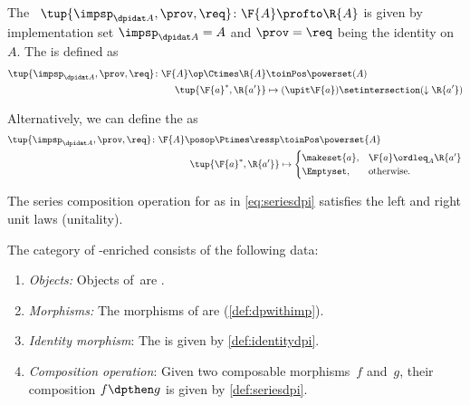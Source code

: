 \begin{definition}
    \label{def:identitydpi}
    The ~$\tup{\impsp_{\dpidat A},\prov,\req} \colon \F{A} \profto \R{A}$ is given by implementation set $\impsp_{\dpidat A} = A$ and $\prov=\req$ being the identity on $A$.
    The  is defined as
    \begin{align}
        \tup{\impsp_{\dpidat A},\prov,\req} \colon \F{A}\op \Ctimes \R{A} & \toinPos \powerset(A) \\
        \tup{\F{a}^*,\R{a'}}                                              & \mapsto (\upit \F{a}) \setintersection (\downarrow \R{a'})
    \end{align}
\end{definition}
\begin{remark}
    Alternatively, we can define the  as
    \begin{align}
        \tup{\impsp_{\dpidat A},\prov,\req}\colon \F{A}\posop \Ptimes \ressp & \toinPos \powerset{A} \\
        \tup{\F{a}^*,\R{a'}}                                                 & \mapsto
        \begin{cases}
            \makeset{a}, & \F{a}\ordleq_A \R{a'} \\
            \Emptyset,   & \text{otherwise}.
        \end{cases}
    \end{align}
\end{remark}

\begin{lemma}
    \label{lem:dp-unital}
    The series composition operation for  as in \cref{eq:seriesdpi} satisfies the left and right unit laws (unitality).
\end{lemma}


\begin{definition}
    \label{def:set-enriched-dp}
    The category of \Set-enriched  \DPI consists of the following data:
    \begin{enumerate}
        \item \emph{Objects:}
              Objects of~\DPI are .
        \item \emph{Morphisms:}
              The morphisms of \DPI are  (\cref{def:dpwithimp}).
        \item \emph{Identity morphism}: The  is given by \cref{def:identitydpi}.
        \item \emph{Composition operation}: Given two composable morphisms~$f$ and~$g$, their composition $f\dpthen g$ is given by \cref{def:seriesdpi}.
    \end{enumerate}
\end{definition}

